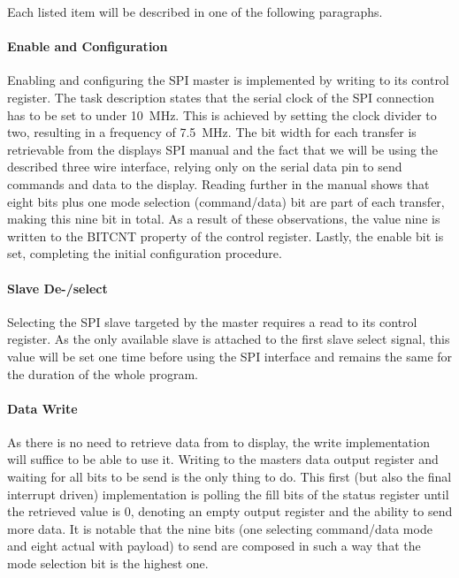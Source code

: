 	   		Each listed item will be described in one of the following paragraphs.

	   		\paragraph{Enable and Configuration} %
	   		\label{par:enable}
	   			Enabling and configuring the SPI master is implemented by writing to its control register. The task description states that the serial clock of the SPI connection has to be set to under \SI{10}{\mega\hertz}. This is achieved by setting the clock divider to two, resulting in a frequency of \SI{7.5}{\mega\hertz}. The bit width for each transfer is retrievable from the displays SPI manual and the fact that we will be using the described three wire interface, relying only on the serial data pin to send commands and data to the display. Reading further in the manual shows that eight bits plus one mode selection (command/data) bit are part of each transfer, making this nine bit in total. As a result of these observations, the value nine is written to the BITCNT property of the control register. Lastly, the enable bit is set, completing the initial configuration procedure.

	   		\paragraph{Slave De-/select} %
	   		\label{par:slave_de_select}
	   			Selecting the SPI slave targeted by the master requires a read to its control register. As the only available slave is attached to the first slave select signal, this value will be set one time before using the SPI interface and remains the same for the duration of the whole program.

	   		\paragraph{Data Write} %
	   		\label{par:data_write}
	   			As there is no need to retrieve data from to display, the write implementation will suffice to be able to use it. Writing to the masters data output register and waiting for all bits to be send is the only thing to do. This first (but also the final interrupt driven) implementation is polling the fill bits of the status register until the retrieved value is 0, denoting an empty output register and the ability to send more data.
	   			It is notable that the nine bits (one selecting command/data mode and eight actual with payload) to send are composed in such a way that the mode selection bit is the highest one.

